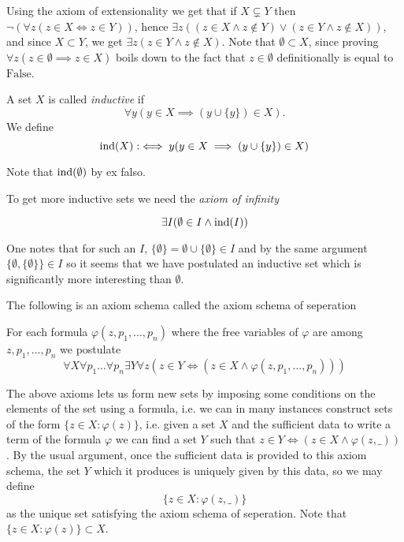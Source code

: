 \begin{remark}
    Using the axiom of extensionality we get that if $X\subsetneq Y$ then $\neg(\forall z(z\in X\iff z\in Y))$, hence $\exists z((z\in X\wedge z\notin Y) \vee (z\in Y \wedge z\notin X))$, and since $X\subset Y$, we get $\exists z(z\in Y \wedge z\notin X)$. Note that $\emptyset \subset X$, since proving $\forall z(z\in \emptyset \implies z\in X)$ boils down to the fact that $z\in \emptyset$ definitionally is equal to $\mathrm{False}$.
\end{remark}
\begin{definition}
    A set $X$ is called \textit{inductive} if 
    $$\forall y(y\in X \implies (y\cup \{y\})\in X).$$
    We define 
    $$\mathrm{ind}(X) :\iff y(y\in X \implies (y\cup \{y\})\in X)$$
\end{definition}
\begin{example}
    Note that $\mathrm{ind}(\emptyset)$ by ex falso.
\end{example}
To get more inductive sets we need the \textit{axiom of infinity}
\begin{axioms}
    $$\exists I(\emptyset \in I \wedge \mathrm{ind}(I))$$
\end{axioms}
\begin{remark}
    One notes that for such an $I$, $\{\emptyset\}=\emptyset \cup \{\emptyset\}\in I$ and by the same argument $\{\emptyset,\{\emptyset\}\}\in I$ so it seems that we have postulated an inductive set which is significantly more interesting than $\emptyset$.  
\end{remark}
The following is an axiom schema called the axiom schema of seperation
\begin{axioms}
    For each formula $\varphi(z,p_1,\dots,p_n)$ where the free variables of $\varphi$ are among $z,p_1,\dots, p_n$ we postulate 
    $$\forall X\forall p_1\dots \forall p_n\exists Y\forall z(z\in Y\iff (z\in X\wedge \varphi(z,p_1,\dots,p_n)))$$
\end{axioms}
The above axioms lets us form new sets by imposing some conditions on the elements of the set using a formula, i.e. we can in many instances construct sets of the form $\{z\in X: \varphi(z)\}$, i.e. given a set $X$ and the sufficient data to write a term of the formula $\varphi$ we can find a set $Y$ such that $z\in Y \iff  (z \in X \wedge \varphi(z,\_))$. By the usual argument, once the sufficient data is provided to this axiom schema, the set $Y$ which it produces is uniquely given by this data, so we may define 
$$\{z\in X : \varphi(z,\_)\}$$
as the unique set satisfying the axiom schema of seperation. Note that $\{z\in X : \varphi(z)\}\subset X$.

